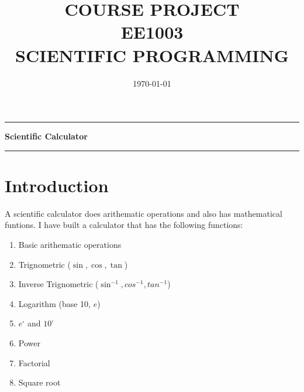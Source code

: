 \documentclass[journal]{IEEEtran}
\begin{document}

\title{\Large\bfseries COURSE PROJECT\\[0.2cm] EE1003 \\[0.2cm] SCIENTIFIC PROGRAMMING}
\date{\today}

\maketitle

\noindent\rule{\textwidth}{0.4pt}

\begin{center}
    \textbf{Scientific Calculator}
\end{center}

\vspace{0.2cm}
\noindent\rule{\textwidth}{0.5pt}

\vspace{1.5cm}

\vfill

\newpage
{\let\newpage\relax\maketitle}

\renewcommand{\thefigure}{\theenumi}
\renewcommand{\thetable}{\theenumi}
\tableofcontents
\newpage
\section{Introduction}

A scientific calculator does arithematic operations and also has mathematical funtions. I have built a calculator that has the following functions:
\begin{enumerate}
  \item Basic arithematic operations
  \item Trignometric ($\sin, \cos, \tan$)
  \item Inverse Trignometric ($\sin^{-1}, cos^{-1},tan^{-1}$)
  \item Logarithm (base 10, $e$)
  \item $e^\square$ and $10^\square$
  \item Power 
  \item Factorial
  \item Square root
\end{enumerate}
\end{document}
